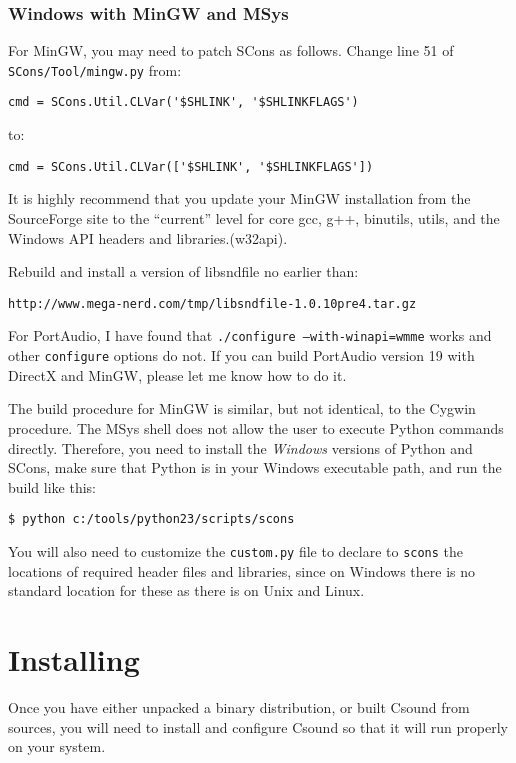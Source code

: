 \documentclass[10pt,letterpaper,onecolumn]{ltxguide}
\begin{document}
\subsubsection{Windows with MinGW and MSys}

For MinGW, you may need to patch SCons as follows. Change line 51 of \texttt{SCons/Tool/mingw.py} from:
\begin{verbatim}
cmd = SCons.Util.CLVar('$SHLINK', '$SHLINKFLAGS')
\end{verbatim}
to:
\begin{verbatim}
cmd = SCons.Util.CLVar(['$SHLINK', '$SHLINKFLAGS']) 
\end{verbatim}

It is highly recommend that you update your MinGW installation from the SourceForge site to the ``current'' level for core gcc, g++, binutils,  utils, and the Windows API headers and libraries.(w32api).

Rebuild and install a version of libsndfile no earlier than:
\begin{verbatim}
http://www.mega-nerd.com/tmp/libsndfile-1.0.10pre4.tar.gz
\end{verbatim}

For PortAudio, I have found that \texttt{./configure ---with-winapi=wmme} works and other \texttt{configure} options do not. If you can build PortAudio version 19 with DirectX and MinGW, please let me know how to do it.

The build procedure for MinGW is similar, but not identical, to the Cygwin procedure. The MSys shell does not allow the user to execute Python commands directly. Therefore, you need to install the \emph{Windows} versions of Python and SCons, make sure that Python is in your Windows executable path, and run the build like this:
\begin{verbatim}
$ python c:/tools/python23/scripts/scons
\end{verbatim}

You will also need to customize the \texttt{custom.py} file to declare to \texttt{scons} the locations of required header files and libraries, since on Windows there is no standard location for these as there is on Unix and Linux.

\section{Installing}

Once you have either unpacked a binary distribution, or built Csound from sources, you will need to install and configure Csound so that it will run properly on your system. 
\end{document}
